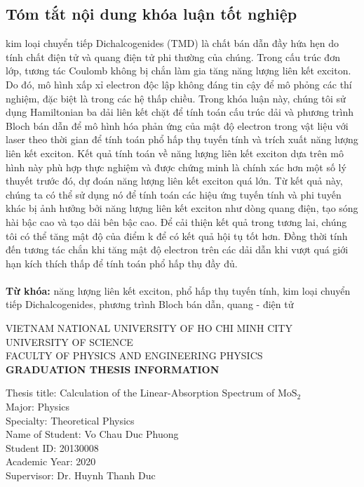 \documentclass[12pt,english,a4paper]{article}
\begin{document}
	\subsection*{Tóm tắt nội dung khóa luận tốt nghiệp}
	\quad kim loại chuyển tiếp Dichalcogenides (TMD) là chất bán dẫn đầy hứa hẹn do tính chất điện tử và quang điện tử phi thường của chúng. Trong cấu trúc đơn lớp, tương tác Coulomb không bị chắn làm gia tăng năng lượng liên kết exciton. Do đó, mô hình xấp xỉ electron độc lập không đáng tin cậy để mô phỏng các thí nghiệm, đặc biệt là trong các hệ thấp chiều. Trong khóa luận này, chúng tôi sử dụng Hamiltonian ba dải liên kết chặt để tính toán cấu trúc dải và phương trình Bloch bán dẫn để mô hình hóa phản ứng của mật độ electron trong vật liệu với laser theo thời gian để tính toán phổ hấp thụ tuyến tính và trích xuất năng lượng liên kết exciton. Kết quả tính toán về năng lượng liên kết exciton dựa trên mô hình này phù hợp thực nghiệm và được chứng minh là chính xác hơn một số lý thuyết trước đó, dự đoán năng lượng liên kết exciton quá lớn. Từ kết quả này, chúng ta có thể sử dụng nó để tính toán các hiệu ứng tuyến tính và phi tuyến khác bị ảnh hưởng bởi năng lượng liên kết exciton như dòng quang điện, tạo sóng hài bậc cao và tạo dải bên bậc cao. Để cải thiện kết quả trong tương lai, chúng tôi có thể tăng mật độ của điểm k để có kết quả hội tụ tốt hơn. Đồng thời tính đến tương tác chắn khi tăng mật độ electron trên các dải dẫn khi vượt quá giới hạn kích thích thấp để tính toán phổ hấp thụ đầy đủ.\\\null
	\\[1cm]
	\textbf{Từ khóa:} năng lượng liên kết exciton, phổ hấp thụ tuyến tính, kim loại chuyển tiếp Dichalcogenides, phương trình Bloch bán dẫn, quang - điện tử
	\newpage
	\begin{center}
		{\large {VIETNAM NATIONAL UNIVERSITY OF HO CHI MINH CITY}\\ {UNIVERSITY OF SCIENCE}\\
		{ {FACULTY OF PHYSICS AND ENGINEERING PHYSICS}}}\\[1cm]
		{\textbf{GRADUATION THESIS INFORMATION}}
	\end{center}
	\quad Thesis title: Calculation of the Linear-Absorption Spectrum of $\mathrm{MoS}_2$\\\null
	\quad Major: Physics\\\null
	\quad Specialty: Theoretical Physics\\\null
	\quad Name of Student: Vo Chau Duc Phuong\\\null
	\quad Student ID: 20130008\\\null
	\quad Academic Year: 2020\\\null
	\quad Supervisor: Dr. Huynh Thanh Duc \\\null
\end{document}
